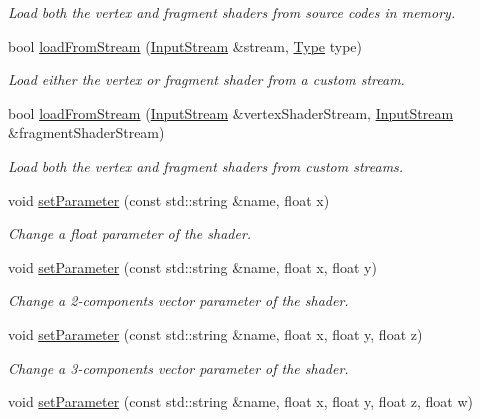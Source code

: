 \begin{DoxyCompactItemize}
\begin{DoxyCompactList}\small\item\em Load both the vertex and fragment shaders from source codes in memory. \end{DoxyCompactList}\item 
bool \hyperlink{classsf_1_1Shader_a2ee1b130c0606e4f8bcdf65c1efc2a53}{load\+From\+Stream} (\hyperlink{classsf_1_1InputStream}{Input\+Stream} \&stream, \hyperlink{classsf_1_1Shader_afaa1aa65e5de37b74d047da9def9f9b3}{Type} type)
\begin{DoxyCompactList}\small\item\em Load either the vertex or fragment shader from a custom stream. \end{DoxyCompactList}\item 
bool \hyperlink{classsf_1_1Shader_a3b7958159ffb5596c4babc3052e35465}{load\+From\+Stream} (\hyperlink{classsf_1_1InputStream}{Input\+Stream} \&vertex\+Shader\+Stream, \hyperlink{classsf_1_1InputStream}{Input\+Stream} \&fragment\+Shader\+Stream)
\begin{DoxyCompactList}\small\item\em Load both the vertex and fragment shaders from custom streams. \end{DoxyCompactList}\item 
void \hyperlink{classsf_1_1Shader_a47e4dd78f0752ae08664b4ee616db1cf}{set\+Parameter} (const std\+::string \&name, float x)
\begin{DoxyCompactList}\small\item\em Change a float parameter of the shader. \end{DoxyCompactList}\item 
void \hyperlink{classsf_1_1Shader_ab8d379f40810b8e3eadebee81aedd231}{set\+Parameter} (const std\+::string \&name, float x, float y)
\begin{DoxyCompactList}\small\item\em Change a 2-\/components vector parameter of the shader. \end{DoxyCompactList}\item 
void \hyperlink{classsf_1_1Shader_a7e36e044d6b8adca8339f40c5a4b1801}{set\+Parameter} (const std\+::string \&name, float x, float y, float z)
\begin{DoxyCompactList}\small\item\em Change a 3-\/components vector parameter of the shader. \end{DoxyCompactList}\item 
void \hyperlink{classsf_1_1Shader_aeb468f1bc2d26750b96b74f1e19027fb}{set\+Parameter} (const std\+::string \&name, float x, float y, float z, float w)

\end{DoxyCompactItemize}
